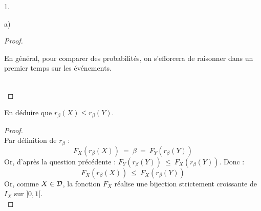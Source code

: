 \documentclass[11pt]{article}%
\begin{document}
\begin{noliste}{1.}
\begin{noliste}{a)}
\begin{proof}
      \begin{remark}
        En général, pour comparer des probabilités, on s'efforcera
        de raisonner dans un premier temps sur les événements.
      \end{remark}~\\[-1.4cm]
    \end{proof}

    
    \item En déduire que $r_\beta(X) \leq r_\beta(Y)$. 
    
    \begin{proof}~\\
      Par définition de $r_\beta$ :
      \[
        F_X(r_\beta(X)) \ = \ \beta \ = \
        F_Y(r_\beta(Y))
      \]
      Or, d'après la question précédente : $F_Y(r_\beta(Y)) \ \leq 
      \ F_X(r_\beta(Y))$. Donc :
      \[
        F_X(r_\beta(X)) \ \leq \ F_X(r_\beta(Y))
      \]
      Or, comme $X \in {\cal D}$, la fonction $F_X$ réalise une 
      bijection strictement croissante de $I_X$ sur $]0,1[$.
      ~\\[-1cm]
    \end{proof}
  \end{noliste}
\end{noliste}


\newpage
\end{document}
